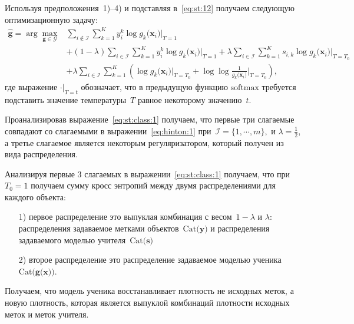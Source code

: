 \documentclass[12pt, twoside]{article}
\begin{document}
Используя предположения~1)--4) и подставляя в~\eqref{eq:st:12} получаем следующую оптимизационную задачу:
\[
\label{eq:st:class:1}
\begin{aligned}
\hat{\mathbf{g}} = \arg\max_{\mathbf{g}\in \mathcal{G}} & \sum_{i\not\in \mathcal{I}}\sum_{k=1}^{K}y_i^k\log g_k\bigr(\mathbf{x}_i\bigr)\bigr|_{T=1} \\
&+ \left(1-\lambda\right)\sum_{i\in \mathcal{I}}\sum_{k=1}^{K}y_i^k\log g_k\bigr(\mathbf{x}_i\bigr)\bigr|_{T=1} + \lambda\sum_{i\in \mathcal{I}}\sum_{k=1}^{K}s_{i,k}\log g_k\bigr(\mathbf{x}_i\bigr)\bigr|_{T=T_0} \\
&+ \lambda \sum_{i\in \mathcal{I}}\sum_{k=1}^{K}\left(\log g_k\bigr(\mathbf{x}_i\bigr)\bigr|_{T=T_0} + \log\log\frac{1}{g_k\bigr(\mathbf{x}_i\bigr)}\bigr|_{T=T_0}\right),
\end{aligned}
\]
где выражение $\cdot\bigr|_{T=t}$ обозначает, что в предыдущую функцию $\text{softmax}$ требуется подставить значение температуры~$T$ равное некоторому значению~$t$.

Проанализировав выражение~\eqref{eq:st:class:1} получаем, что первые три слагаемые совпадают со слагаемыми в выражении~\eqref{eq:hinton:1} при~$\mathcal{I} = \{1, \cdots, m\},$ и $\lambda=\frac{1}{2}$, а третье слагаемое является некоторым регуляризатором, который получен из вида распределения.

Анализируя первые 3 слагаемых в выражении~\eqref{eq:st:class:1} получаем, что при~$T_0 = 1$ получаем сумму кросс энтропий между двумя распределениями для каждого объекта:
\begin{enumerate}
	\item[1)] первое распределение это выпуклая комбинация с весом~$1-\lambda$ и $\lambda$: распределения задаваемое метками объектов~$\text{Cat}\bigr(\mathbf{y}\bigr)$ и распределения задаваемого моделью учителя~$\text{Cat}\bigr(\mathbf{s}\bigr)$
	\item[2)] второе распределение это распределение задаваемое моделью ученика~$\text{Cat}\bigr(\mathbf{g}\bigr(\mathbf{x}\bigr)\bigr)$.
\end{enumerate}
Получаем, что модель ученика восстанавливает плотность не исходных меток, а новую плотность, которая является выпуклой комбинаций плотности исходных меток и меток учителя.
\end{document}
